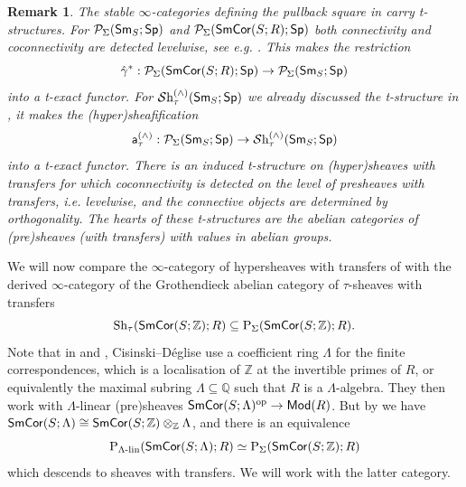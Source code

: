 \documentclass[reqno]{amsart}
\numberwithin{equation}{section}\theoremstyle{thms}
\theoremstyle{defn}
\newtheorem{rem}[equation]{Remark}
\newcommand{\nP}{\tn{P}}
\newcommand{\bQ}{\mathbb{Q}}
\newcommand{\bZ}{\mathbb{Z}}
\newcommand{\cP}{\mathcal{P}}
\newcommand{\tn}[1]{\textnormal{#1}}
\newcommand{\tsf}[1]{\textsf{\textup{#1}}}
\newcommand{\mcal}[1]{\mathcal{#1}}
\newcommand{\op}{\tn{op}}
\newcommand{\psigma}{\cP_{\Sigma}}
\newcommand{\sheaves}{\mcal{S}\tn{h}}
\newcommand{\Mod}{\tsf{Mod}}
\newcommand{\spec}{\tsf{Sp}}
\newcommand{\sms}{\tsf{Sm}_S}
\newcommand{\corsms}[1]{\tsf{SmCor}(S;#1)}
\begin{document}
\begin{rem}\label{rem:tstrucuresonsheaveswithtransfers}
The stable $\infty$-categories defining the pullback square in  carry t-structures. For $\psigma(\sms;\spec)$ and $\psigma(\corsms{R};\spec)$ both connectivity and coconnectivity are detected levelwise, see e.g. \cite[Definition 2.5]{bcn25}. This makes the restriction 
$$\hat{\gamma}^*: \psigma(\corsms{R};\spec) \to \psigma(\sms;\spec)$$
into a t-exact functor. For $\sheaves_{\tau}^{(\wedge)}(\sms;\spec)$ we already discussed the t-structure in , it makes the (hyper)sheafification
$$\tsf{a}^{(\wedge)}_{\tau}: \psigma(\sms;\spec) \to \sheaves_{\tau}^{(\wedge)}(\sms;\spec)$$
into a t-exact functor. There is an induced t-structure on (hyper)sheaves with transfers for which coconnectivity is detected on the level of presheaves with transfers, i.e. levelwise, and the connective objects are determined by orthogonality. The hearts of these t-structures are the abelian categories of (pre)sheaves (with transfers) with values in abelian groups.

\end{rem}

We will now compare the $\infty$-category of hypersheaves with transfers of  with the derived $\infty$-category of the Grothendieck abelian category of $\tau$-sheaves with transfers 
$$\tn{Sh}_{\tau}(\corsms{\bZ};R) \subseteq \nP_{\Sigma}(\corsms{\bZ};R).$$
Note that in \cite[§10]{cd19} and \cite{cd16}, Cisinski--Déglise use a coefficient ring $\Lambda$ for the finite correspondences, which is a localisation of $\bZ$ at the invertible primes of $R$, or equivalently the maximal subring $\Lambda \subseteq \bQ$ such that $R$ is a $\Lambda$-algebra. They then work with $\Lambda$-linear (pre)sheaves $\corsms{\Lambda}^\op \to \Mod(R)$. But by \cite[Remark 9.1.3]{cd19} we have $\corsms{\Lambda} \cong \corsms{\bZ} \otimes_{\bZ} \Lambda$, and there is an equivalence
$$\nP_{\Lambda\tn{-lin}}(\corsms{\Lambda};R) \simeq \nP_{\Sigma}(\corsms{\bZ};R)$$
which descends to sheaves with transfers. We will work with the latter category.
\end{document}
